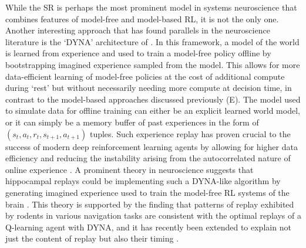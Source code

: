 While the SR is perhaps the most prominent model in systems neuroscience that combines features of model-free and model-based RL, it is not the only one.
Another interesting approach that has found parallels in the neuroscience literature is the `DYNA' architecture of \citet{sutton1991dyna}.
In this framework, a model of the world is learned from experience and used to train a model-free policy offline by bootstrapping imagined experience sampled from the model.
This allows for more data-efficient learning of model-free policies at the cost of additional compute during `rest' but without necessarily needing more compute at decision time, in contrast to the model-based approaches discussed previously (E).
The model used to simulate data for offline training can either be an explicit learned world model, or it can simply be a memory buffer of past experiences in the form of $(s_t, a_t, r_t, s_{t+1}, a_{t+1})$ tuples.
Such experience replay has proven crucial to the success of modern deep reinforcement learning agents by allowing for higher data efficiency and reducing the instability arising from the autocorrelated nature of online experience \citep{mnih2013playing,schaul2015prioritized}.
A prominent theory in neuroscience suggests that hippocampal replays could be implementing such a DYNA-like algorithm by generating imagined experience used to train the model-free RL systems of the brain \citep{mattar2018prioritized}.
This theory is supported by the finding that patterns of replay exhibited by rodents in various navigation tasks are consistent with the optimal replays of a Q-learning agent with DYNA, and it has recently been extended to explain not just the content of replay but also their timing \citep{agrawal2022temporal}.
